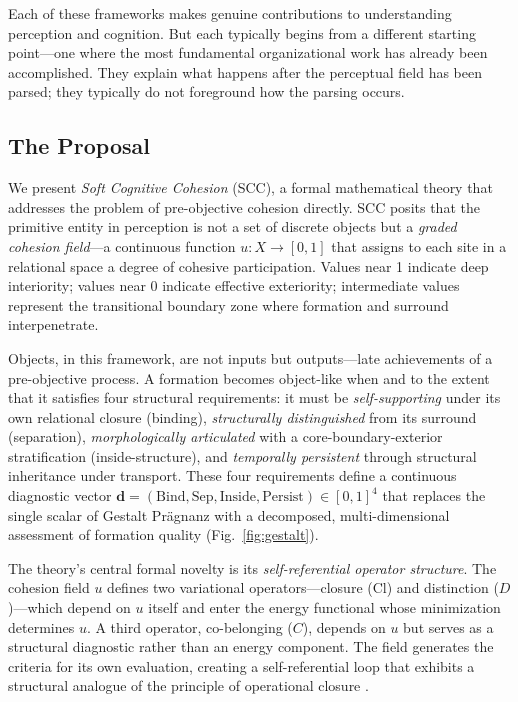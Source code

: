 \documentclass[lettersize,journal]{IEEEtran}
\begin{document}
Each of these frameworks makes genuine contributions to understanding perception and cognition. But each typically begins from a different starting point---one where the most fundamental organizational work has already been accomplished. They explain what happens after the perceptual field has been parsed; they typically do not foreground how the parsing occurs.

\subsection{The Proposal}

We present \emph{Soft Cognitive Cohesion} (SCC), a formal mathematical theory that addresses the problem of pre-objective cohesion directly. SCC posits that the primitive entity in perception is not a set of discrete objects but a \emph{graded cohesion field}---a continuous function $u : X \to [0,1]$ that assigns to each site in a relational space a degree of cohesive participation. Values near 1 indicate deep interiority; values near 0 indicate effective exteriority; intermediate values represent the transitional boundary zone where formation and surround interpenetrate.

Objects, in this framework, are not inputs but outputs---late achievements of a pre-objective process. A formation becomes object-like when and to the extent that it satisfies four structural requirements: it must be \emph{self-supporting} under its own relational closure (binding), \emph{structurally distinguished} from its surround (separation), \emph{morphologically articulated} with a core-boundary-exterior stratification (inside-structure), and \emph{temporally persistent} through structural inheritance under transport. These four requirements define a continuous diagnostic vector $\mathbf{d} = (\text{Bind}, \text{Sep}, \text{Inside}, \text{Persist}) \in [0,1]^4$ that replaces the single scalar of Gestalt Pr\"{a}gnanz with a decomposed, multi-dimensional assessment of formation quality (Fig.~\ref{fig:gestalt}).

The theory's central formal novelty is its \emph{self-referential operator structure}. The cohesion field $u$ defines two variational operators---closure ($\mathrm{Cl}$) and distinction ($D$)---which depend on $u$ itself and enter the energy functional whose minimization determines $u$. A third operator, co-belonging ($C$), depends on $u$ but serves as a structural diagnostic rather than an energy component. The field generates the criteria for its own evaluation, creating a self-referential loop that exhibits a structural analogue of the principle of operational closure \cite{maturana1980autopoiesis}.
\end{document}
